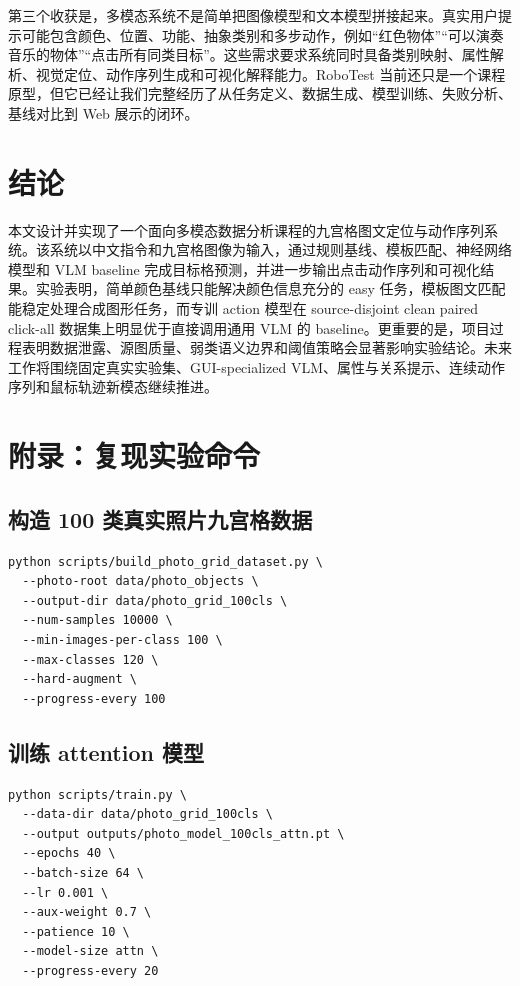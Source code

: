 \documentclass[UTF8,a4paper,12pt,fontset=fandol]{ctexart}
\begin{document}
第三个收获是，多模态系统不是简单把图像模型和文本模型拼接起来。真实用户提示可能包含颜色、位置、功能、抽象类别和多步动作，例如“红色物体”“可以演奏音乐的物体”“点击所有同类目标”。这些需求要求系统同时具备类别映射、属性解析、视觉定位、动作序列生成和可视化解释能力。RoboTest 当前还只是一个课程原型，但它已经让我们完整经历了从任务定义、数据生成、模型训练、失败分析、基线对比到 Web 展示的闭环。

\section{结论}

本文设计并实现了一个面向多模态数据分析课程的九宫格图文定位与动作序列系统。该系统以中文指令和九宫格图像为输入，通过规则基线、模板匹配、神经网络模型和 VLM baseline 完成目标格预测，并进一步输出点击动作序列和可视化结果。实验表明，简单颜色基线只能解决颜色信息充分的 easy 任务，模板图文匹配能稳定处理合成图形任务，而专训 action 模型在 source-disjoint clean paired click-all 数据集上明显优于直接调用通用 VLM 的 baseline。更重要的是，项目过程表明数据泄露、源图质量、弱类语义边界和阈值策略会显著影响实验结论。未来工作将围绕固定真实实验集、GUI-specialized VLM、属性与关系提示、连续动作序列和鼠标轨迹新模态继续推进。

\clearpage
\appendix

\section{附录：复现实验命令}

\subsection{构造 100 类真实照片九宫格数据}
\begin{verbatim}
python scripts/build_photo_grid_dataset.py \
  --photo-root data/photo_objects \
  --output-dir data/photo_grid_100cls \
  --num-samples 10000 \
  --min-images-per-class 100 \
  --max-classes 120 \
  --hard-augment \
  --progress-every 100
\end{verbatim}

\subsection{训练 attention 模型}
\begin{verbatim}
python scripts/train.py \
  --data-dir data/photo_grid_100cls \
  --output outputs/photo_model_100cls_attn.pt \
  --epochs 40 \
  --batch-size 64 \
  --lr 0.001 \
  --aux-weight 0.7 \
  --patience 10 \
  --model-size attn \
  --progress-every 20
\end{verbatim}
\end{document}

